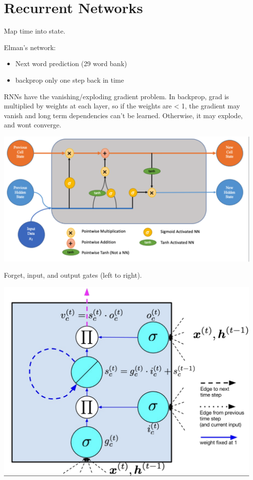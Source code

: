 \section{Recurrent Networks}

Map time into state.

Elman's network:
\begin{itemize}
  \item Next word prediction (29 word bank)
  \item backprop only one step back in time
\end{itemize}

RNNs have the vanishing/exploding gradient problem. In backprop, grad is multiplied by weights
at each layer, so if the weights are < 1, the gradient may vanish and long term dependencies can't
be learned. Otherwise, it may explode, and wont converge.

\includegraphics[width=0.9\columnwidth]{images/lstm}

Forget, input, and output gates (left to right).

\includegraphics[width=0.9\columnwidth]{images/memcell}
